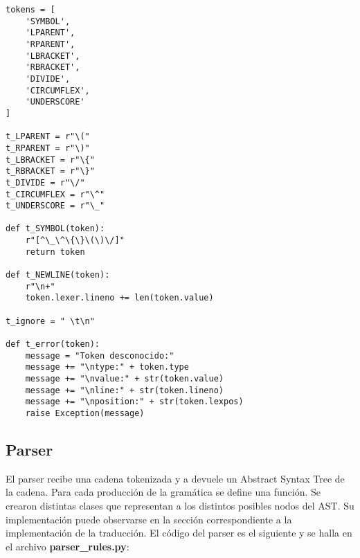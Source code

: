 \begin{verbatim}
tokens = [
	'SYMBOL',
	'LPARENT',
	'RPARENT',
	'LBRACKET',
	'RBRACKET',
	'DIVIDE',
	'CIRCUMFLEX',
	'UNDERSCORE'
]

t_LPARENT = r"\("
t_RPARENT = r"\)"
t_LBRACKET = r"\{"
t_RBRACKET = r"\}"
t_DIVIDE = r"\/"
t_CIRCUMFLEX = r"\^"
t_UNDERSCORE = r"\_"

def t_SYMBOL(token):
	r"[^\_\^\{\}\(\)\/]"
	return token

def t_NEWLINE(token):
    r"\n+"
    token.lexer.lineno += len(token.value)

t_ignore = " \t\n"

def t_error(token):
    message = "Token desconocido:"
    message += "\ntype:" + token.type
    message += "\nvalue:" + str(token.value)
    message += "\nline:" + str(token.lineno)
    message += "\nposition:" + str(token.lexpos)
    raise Exception(message)
\end{verbatim}

\subsection{Parser}

\indent \indent El parser recibe una cadena tokenizada y a devuele un Abstract Syntax Tree de la cadena. Para cada producción de la gramática se define una función. Se crearon distintas clases que representan a los distintos posibles nodos del AST. Su implementación puede observarse en la sección correspondiente a la implementación de la traducción. El código del parser es el siguiente y se halla en el archivo \textbf{parser\_rules.py}:\\

